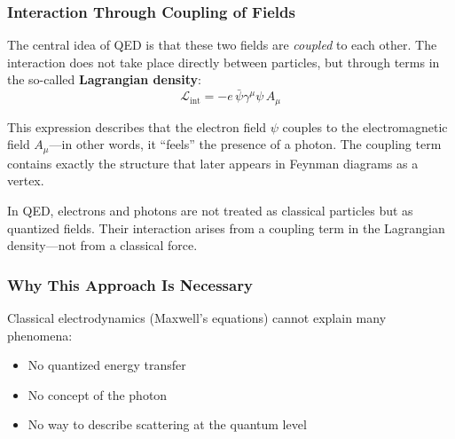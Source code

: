 \subsubsection*{Interaction Through Coupling of Fields}
The central idea of QED is that these two fields are \emph{coupled} to each other. The interaction does not take place directly between particles, but through terms in the so-called \textbf{Lagrangian density}:
\[
\mathcal{L}_{\text{int}} = -e \, \bar{\psi} \gamma^\mu \psi \, A_\mu
\]

This expression describes that the electron field $\psi$ couples to the electromagnetic field $A_\mu$—in other words, it “feels” the presence of a photon. The coupling term contains exactly the structure that later appears in Feynman diagrams as a vertex.

\vspace{0.5em}
\begin{tcolorbox}[physikbox, title=Field Theory Instead of Particle Mechanics]
	\label{box:Feldtheorie statt Teilchenmechanik}
	In QED, electrons and photons are not treated as classical particles but as quantized fields. Their interaction arises from a coupling term in the Lagrangian density—not from a classical force.
\end{tcolorbox}

\subsubsection*{Why This Approach Is Necessary}
Classical electrodynamics (Maxwell’s equations) cannot explain many phenomena:
\begin{itemize}
	\item No quantized energy transfer
	\item No concept of the photon
	\item No way to describe scattering at the quantum level
\end{itemize}

